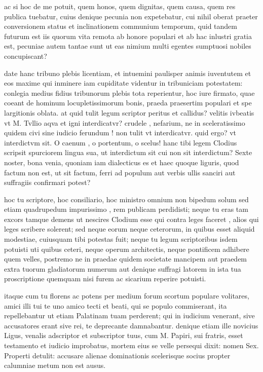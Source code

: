  ac si hoc de me potuit, quem honos, quem dignitas, quem causa, quem res publica tuebatur, cuius denique pecunia non expetebatur, cui nihil oberat praeter conversionem status et inclinationem communium temporum, quid tandem futurum est iis quorum vita remota ab honore populari et ab hac inlustri gratia est, pecuniae autem tantae sunt ut eas nimium multi egentes sumptuosi nobiles concupiscant?

 date hanc tribuno plebis licentiam, et intuemini paulisper animis iuventutem et eos maxime qui inminere iam cupiditate videntur in tribuniciam potestatem: conlegia medius fidius tribunorum plebis tota reperientur, hoc iure firmato, quae coeant de hominum locupletissimorum bonis, praeda praesertim populari et spe largitionis oblata. at quid tulit legum scriptor peritus et callidus? velitis ivbeatis vt M. Tvllio aqva et igni interdicatvr? crudele , nefarium, ne in sceleratissimo quidem civi sine iudicio ferundum ! non tulit vt interdicatvr. quid ergo? vt interdictvm sit. O caenum , o portentum, o scelus! hanc tibi legem Clodius scripsit spurciorem lingua sua, ut interdictum sit cui non sit interdictum? Sexte noster, bona venia, quoniam iam dialecticus es et haec quoque liguris, quod factum non est, ut sit factum, ferri ad populum aut verbis ullis sanciri aut suffragiis confirmari potest?

 hoc tu scriptore, hoc consiliario, hoc ministro omnium non bipedum solum sed etiam quadrupedum impurissimo , rem publicam perdidisti; neque tu eras tam excors tamque demens ut nescires Clodium esse qui contra leges faceret , alios qui leges scribere solerent; sed neque eorum neque ceterorum, in quibus esset aliquid modestiae, cuiusquam tibi potestas fuit; neque tu legum scriptoribus isdem potuisti uti quibus ceteri, neque operum architectis, neque pontificem adhibere quem velles, postremo ne in praedae quidem societate mancipem aut praedem extra tuorum gladiatorum numerum aut denique suffragi latorem in ista tua proscriptione quemquam nisi furem ac sicarium reperire potuisti.

 itaque cum tu florens ac potens per medium forum scortum populare volitares, amici illi tui te uno amico tecti et beati, qui se populo commiserant, ita repellebantur ut etiam Palatinam tuam perderent; qui in iudicium venerant, sive accusatores erant sive rei, te deprecante damnabantur. denique etiam ille novicius Ligus, venalis adscriptor et subscriptor tuus, cum M. Papiri, sui fratris, esset testamento et iudicio improbatus, mortem eius se velle persequi dixit: nomen Sex. Properti detulit: accusare alienae dominationis scelerisque socius propter calumniae metum non est ausus.

